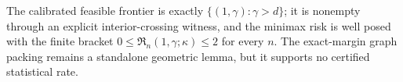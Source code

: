 The calibrated feasible frontier is exactly \(\{(1,\gamma):\gamma>d\}\); it is nonempty through an explicit interior-crossing witness, and the minimax risk is well posed with the finite bracket \(0\le\mathfrak R_n(1,\gamma;\kappa)\le2\) for every \(n\). The exact-margin graph packing remains a standalone geometric lemma, but it supports no certified statistical rate.
